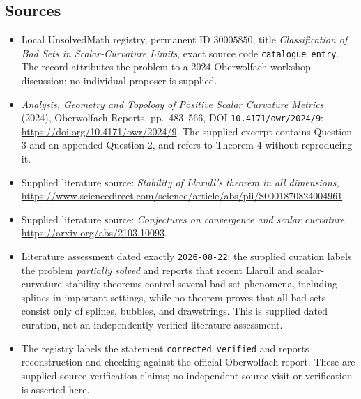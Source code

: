 \documentclass[11pt]{article}
\begin{document}
\subsection{Sources}
\begin{itemize}
\item Local UnsolvedMath registry, permanent ID \(30005850\), title \emph{Classification of Bad Sets in Scalar-Curvature Limits}, exact source code \texttt{catalogue entry}. The record attributes the problem to a 2024 Oberwolfach workshop discussion; no individual proposer is supplied.
\item \emph{Analysis, Geometry and Topology of Positive Scalar Curvature Metrics} (2024), Oberwolfach Reports, pp.\ 483--566, DOI \texttt{10.4171/owr/2024/9}: \url{https://doi.org/10.4171/owr/2024/9}. The supplied excerpt contains Question 3 and an appended Question 2, and refers to Theorem 4 without reproducing it.
\item Supplied literature source: \emph{Stability of Llarull's theorem in all dimensions}, \url{https://www.sciencedirect.com/science/article/abs/pii/S0001870824004961}.
\item Supplied literature source: \emph{Conjectures on convergence and scalar curvature}, \url{https://arxiv.org/abs/2103.10093}.
\item Literature assessment dated exactly \texttt{2026-08-22}: the supplied curation labels the problem \emph{partially solved} and reports that recent Llarull and scalar-curvature stability theorems control several bad-set phenomena, including splines in important settings, while no theorem proves that all bad sets consist only of splines, bubbles, and drawstrings. This is supplied dated curation, not an independently verified literature assessment.
\item The registry labels the statement \texttt{corrected\_verified} and reports reconstruction and checking against the official Oberwolfach report. These are supplied source-verification claims; no independent source visit or verification is asserted here.
\end{itemize}
\end{document}
